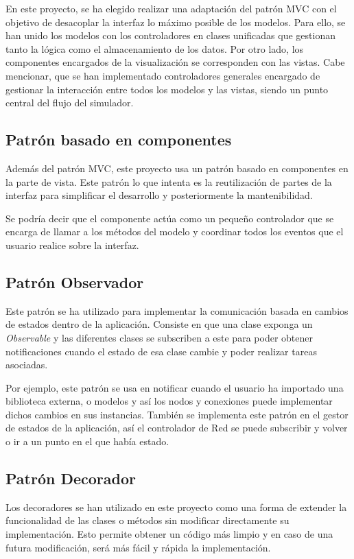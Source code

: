 En este proyecto, se ha elegido realizar una adaptación del patrón MVC con el objetivo de desacoplar la interfaz lo máximo posible de los modelos. Para ello, se han unido los modelos con los controladores en clases unificadas que gestionan tanto la lógica como el almacenamiento de los datos. Por otro lado, los componentes encargados de la visualización se corresponden con las vistas. Cabe mencionar, que se han implementado controladores generales encargado de gestionar la interacción entre todos los modelos y las vistas, siendo un punto central del flujo del simulador.

\subsection{Patrón basado en componentes}
\label{subsec:PatronBasadoComponentes}
Además del patrón MVC, este proyecto usa un patrón basado en componentes en la parte de vista. Este patrón lo que intenta es la reutilización de partes de la interfaz para simplificar el desarrollo y posteriormente la mantenibilidad.

Se podría decir que el componente actúa como un pequeño controlador que se encarga de llamar a los métodos del modelo y coordinar todos los eventos que el usuario realice sobre la interfaz.

\subsection{Patrón Observador}
\label{subsec:PatronObservador}
Este patrón se ha utilizado para implementar la comunicación basada en cambios de estados dentro de la aplicación. Consiste en que una clase exponga un \textit{Observable} y las diferentes clases se subscriben a este para poder obtener notificaciones cuando el estado de esa clase cambie y poder realizar tareas asociadas.

Por ejemplo, este patrón se usa en notificar cuando el usuario ha importado una biblioteca externa, o modelos y así los nodos y conexiones puede implementar dichos cambios en sus instancias. También se implementa este patrón en el gestor de estados de la aplicación, así el controlador de Red se puede subscribir y volver o ir a un punto en el que había estado.

\subsection{Patrón Decorador}
\label{subsec:PatronDecorador}
Los decoradores se han utilizado en este proyecto como una forma de extender la funcionalidad de las clases o métodos sin modificar directamente su implementación. Esto permite obtener un código más limpio y en caso de una futura modificación, será más fácil y rápida la implementación.


